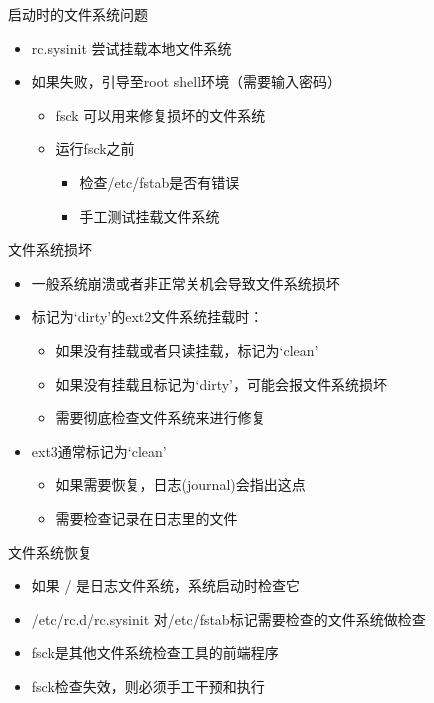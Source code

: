 \begin{frame}{启动时的文件系统问题}
\begin{itemize}
\item rc.sysinit 尝试挂载本地文件系统
\item 如果失败，引导至root shell环境（需要输入密码）

\begin{itemize}
\item fsck 可以用来修复损坏的文件系统
\item 运行fsck之前

\begin{itemize}
\item 检查/etc/fstab是否有错误
\item 手工测试挂载文件系统
\end{itemize}
\end{itemize}
\end{itemize}

\end{frame} 
\begin{frame}{文件系统损坏}
\begin{itemize}
\item 一般系统崩溃或者非正常关机会导致文件系统损坏
\item 标记为`dirty'的ext2文件系统挂载时：

\begin{itemize}
\item 如果没有挂载或者只读挂载，标记为`clean'
\item 如果没有挂载且标记为`dirty'，可能会报文件系统损坏
\item 需要彻底检查文件系统来进行修复
\end{itemize}
\item ext3通常标记为`clean'

\begin{itemize}
\item 如果需要恢复，日志(journal)会指出这点
\item 需要检查记录在日志里的文件
\end{itemize}
\end{itemize}

\end{frame} 
\begin{frame}{文件系统恢复}
\begin{itemize}
\item 如果 / 是日志文件系统，系统启动时检查它
\item /etc/rc.d/rc.sysinit 对/etc/fstab标记需要检查的文件系统做检查
\item fsck是其他文件系统检查工具的前端程序
\item fsck检查失效，则必须手工干预和执行
\end{itemize}

\end{frame} 
